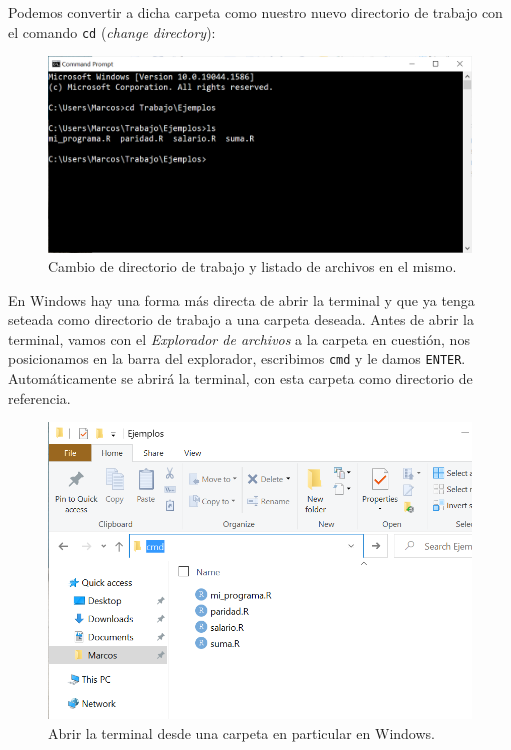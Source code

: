 \documentclass[
]{book}
\begin{document}
Podemos convertir a dicha carpeta como nuestro nuevo directorio de trabajo con el comando \texttt{cd} (\emph{change directory}):

\begin{figure}

{\centering \includegraphics[width=0.8\linewidth]{images/07_otros/terminal5} 

}

\caption{Cambio de directorio de trabajo y listado de archivos en el mismo.}\label{fig:unnamed-chunk-179}
\end{figure}

En Windows hay una forma más directa de abrir la terminal y que ya tenga seteada como directorio de trabajo a una carpeta deseada. Antes de abrir la terminal, vamos con el \emph{Explorador de archivos} a la carpeta en cuestión, nos posicionamos en la barra del explorador, escribimos \texttt{cmd} y le damos \texttt{ENTER}. Automáticamente se abrirá la terminal, con esta carpeta como directorio de referencia.

\begin{figure}

{\centering \includegraphics[width=0.8\linewidth]{images/07_otros/terminal6} 

}

\caption{Abrir la terminal desde una carpeta en particular en Windows.}\label{fig:unnamed-chunk-180}
\end{figure}
\end{document}
